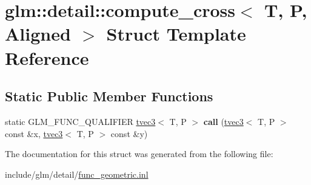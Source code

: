 \hypertarget{structglm_1_1detail_1_1compute__cross}{}\section{glm\+:\+:detail\+:\+:compute\+\_\+cross$<$ T, P, Aligned $>$ Struct Template Reference}
\label{structglm_1_1detail_1_1compute__cross}
\subsection*{Static Public Member Functions}
\begin{DoxyCompactItemize}
\item 
\mbox{\label{structglm_1_1detail_1_1compute__cross_a9b2face4658ee76688f3335542b3b3b2}} 
static G\+L\+M\+\_\+\+F\+U\+N\+C\+\_\+\+Q\+U\+A\+L\+I\+F\+I\+ER \hyperlink{structglm_1_1tvec3}{tvec3}$<$ T, P $>$ {\bfseries call} (\hyperlink{structglm_1_1tvec3}{tvec3}$<$ T, P $>$ const \&x, \hyperlink{structglm_1_1tvec3}{tvec3}$<$ T, P $>$ const \&y)
\end{DoxyCompactItemize}


The documentation for this struct was generated from the following file\+:\begin{DoxyCompactItemize}
\item 
include/glm/detail/\hyperlink{func__geometric_8inl}{func\+\_\+geometric.\+inl}\end{DoxyCompactItemize}
